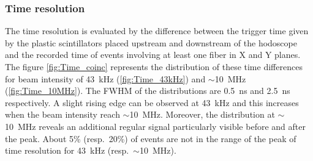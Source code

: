 \documentclass[a4paper,11pt]{article}
\begin{document}
\subsubsection{Time resolution}

The time resolution is evaluated by the difference between the trigger time given by the plastic scintillators placed upstream and downstream of the hodoscope and the recorded time of events involving at least one fiber in X and Y planes. The figure \ref{fig:Time_coinc} represents the distribution of these time differences for beam intensity of 43~kHz (\ref{fig:Time_43kHz}) and $\sim$10~MHz (\ref{fig:Time_10MHz}). The FWHM of the distributions are 0.5~ns and 2.5~ns respectively. A slight rising edge can be observed at 43~kHz and this increases when the beam intensity reach $\sim$10~MHz. Moreover, the distribution at $\sim$10~MHz reveals an additional regular signal particularly visible before and after the peak. About 5\% (resp.~20\%) of events are not in the range of the peak of time resolution for 43~kHz (resp.~$\sim$10~MHz).
\label{Time_resolution}
\end{document}
